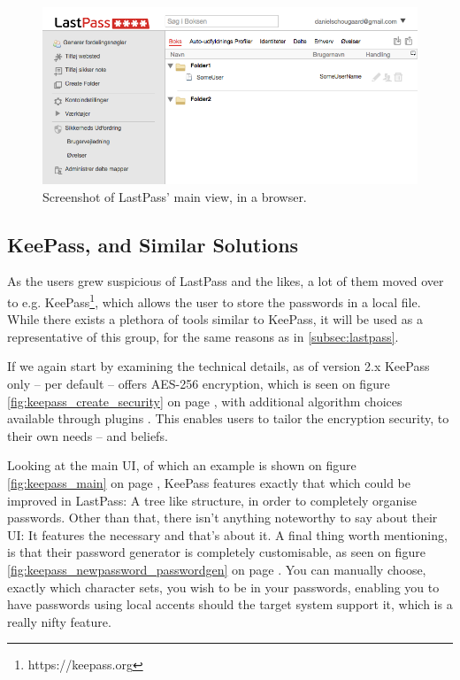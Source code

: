 			\begin{figure}[h!]
				\centering
				\includegraphics[width=\textwidth]{figures/analysis/lastpass_main.png}
				\caption{Screenshot of LastPass' main view, in a browser.}
				\label{fig:lastpass_main}
			\end{figure}

		\subsection*{KeePass, and Similar Solutions}
			As the users grew suspicious of LastPass and the likes, a lot of them moved over to e.g. KeePass\footnote{https://keepass.org}, which allows the user to store the passwords in a local file. While there exists a plethora of tools similar to KeePass,  it will be used as a representative of this group, for the same reasons as in \ref{subsec:lastpass}.

			If we again start by examining the technical details, as of version 2.x KeePass only -- per default -- offers AES-256 encryption, which is seen on figure \ref{fig:keepass_create_security} on page \pageref{fig:keepass_create_security}, with additional algorithm choices available through plugins \cite{keepass_security}. This enables users to tailor the encryption security, to their own needs -- and beliefs. 

			Looking at the main UI, of which an example is shown on figure \ref{fig:keepass_main} on page \pageref{fig:keepass_main}, KeePass features exactly that which could be improved in LastPass: A tree like structure, in order to completely organise passwords. Other than that, there isn't anything noteworthy to say about their UI: It features the necessary and that's about it. A final thing worth mentioning, is that their password generator is completely customisable, as seen on figure \ref{fig:keepass_newpassword_passwordgen} on page \pageref{fig:keepass_newpassword_passwordgen}. You can manually choose, exactly which character sets, you wish to be in your passwords, enabling you to have passwords using local accents should the target system support it, which is a really nifty feature.


